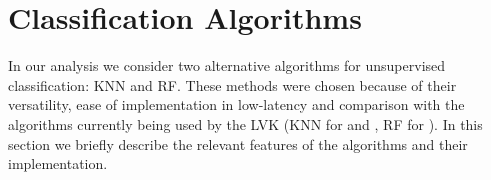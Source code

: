 \section{Classification Algorithms} \label{algos}

In our analysis we consider two alternative algorithms for unsupervised classification: \ac{KNN} and \ac{RF}. These methods were chosen because of their versatility, ease of implementation in low-latency and comparison with the algorithms currently being used by the \ac{LVK} (\ac{KNN} for \hasns and \hasrem, \ac{RF} for \hasgap).
In this section we briefly describe the relevant features of the algorithms and their implementation. 





